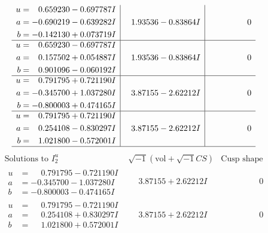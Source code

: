 \documentclass[1p]{elsarticle_modified}
\theoremstyle{definition}
\newcommand{\I}{\sqrt{-1}}
\begin{document}
$$\begin{array}{c|c|c}
\begin{aligned}
u &= \phantom{-}0.659230 - 0.697787 I \\
a &= -0.690219 - 0.639282 I \\
b &= -0.142130 + 0.073719 I\end{aligned}
 & \phantom{-}1.93536 - 0.83864 I & \phantom{-0.000000 } 0 \\ \hline\begin{aligned}
u &= \phantom{-}0.659230 - 0.697787 I \\
a &= \phantom{-}0.157502 + 0.054887 I \\
b &= \phantom{-}0.901096 - 0.060192 I\end{aligned}
 & \phantom{-}1.93536 - 0.83864 I & \phantom{-0.000000 } 0 \\ \hline\begin{aligned}
u &= \phantom{-}0.791795 + 0.721190 I \\
a &= -0.345700 + 1.037280 I \\
b &= -0.800003 + 0.474165 I\end{aligned}
 & \phantom{-}3.87155 - 2.62212 I & \phantom{-0.000000 } 0 \\ \hline\begin{aligned}
u &= \phantom{-}0.791795 + 0.721190 I \\
a &= \phantom{-}0.254108 - 0.830297 I \\
b &= \phantom{-}1.021800 - 0.572001 I\end{aligned}
 & \phantom{-}3.87155 - 2.62212 I & \phantom{-0.000000 } 0\\
 \hline 
 \end{array}$$\newpage$$\begin{array}{c|c|c}  
\text{Solutions to }I^u_{2}& \I (\text{vol} + \sqrt{-1}CS) & \text{Cusp shape}\\
 \hline 
\begin{aligned}
u &= \phantom{-}0.791795 - 0.721190 I \\
a &= -0.345700 - 1.037280 I \\
b &= -0.800003 - 0.474165 I\end{aligned}
 & \phantom{-}3.87155 + 2.62212 I & \phantom{-0.000000 } 0 \\ \hline\begin{aligned}
u &= \phantom{-}0.791795 - 0.721190 I \\
a &= \phantom{-}0.254108 + 0.830297 I \\
b &= \phantom{-}1.021800 + 0.572001 I\end{aligned}
 & \phantom{-}3.87155 + 2.62212 I & \phantom{-0.000000 } 0 \\ \hline\begin{aligned}

\end{aligned}
\end{array}$$
\end{document}
